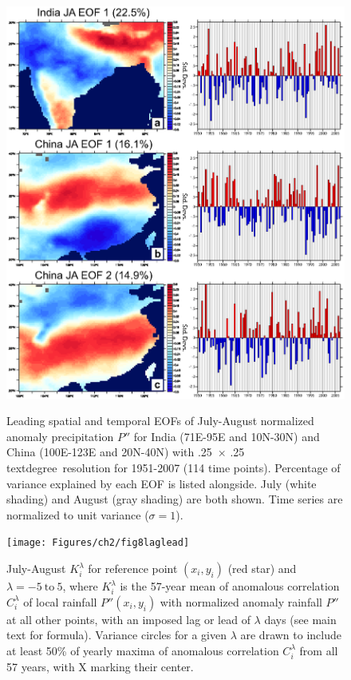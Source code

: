 \begin{figure}[t]
  \noindent\includegraphics[width=36pc,angle=0]{Figures/ch2/fig7eof_region}\\
  \caption{Leading spatial and temporal EOFs of July-August normalized anomaly precipitation $P''$ for India (71\textdegree E-95\textdegree E and 10\textdegree N-30\textdegree N) and China (100\textdegree E-123\textdegree E and 20\textdegree N-40\textdegree N) with .25\textdegree\ $\times$ .25
  textdegree\ resolution for 1951-2007 (114 time points). Percentage of variance explained by each EOF is listed alongside. July (white shading) and August (gray shading) are both shown. Time series are normalized to unit variance ($\sigma=1$).}\label{fig:f27}
\end{figure}

\begin{figure}[t]
  \noindent\texttt{[image: Figures/ch2/fig8laglead]}\\
  \caption{July-August $K_i^\lambda$ for reference point $(x_i,y_i)$ (red star) and $\lambda= -5\ \mathrm{ to }\ 5$, where $K_i^\lambda$ is the 57-year mean of anomalous correlation $C_i^\lambda$ of local rainfall $P''(x_i,y_i)$ with normalized anomaly rainfall $P''$ at all other points, with an imposed lag or lead of $\lambda$ days (see main text for formula). Variance circles for a given $\lambda$ are drawn to include at least 50\% of yearly maxima of anomalous correlation $C_i^\lambda$ from all 57 years, with X marking their center.}
  \label{fig:f28}
\end{figure}

